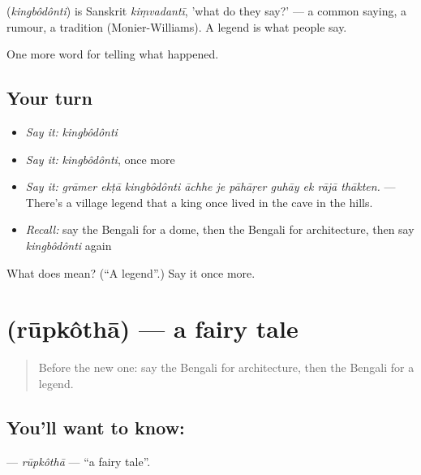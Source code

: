 \begin{cousinweb}
\textbf{} (\emph{kingbôdônti}) is Sanskrit \emph{kiṃvadantī}, 'what do they say?' — a common saying, a rumour, a tradition (Monier-Williams). A legend is what people say.
\end{cousinweb}

\begin{grammarlens}[title={What you've built}]
One more word for telling what happened.
\end{grammarlens}

\subsection*{Your turn}
\begin{itemize}
\raggedright
  \item \emph{Say it:} \emph{kingbôdônti}
  \item \emph{Say it:} \emph{kingbôdônti}, once more
  \item \emph{Say it:} \emph{grāmer ekṭā kingbôdônti āchhe je pāhāṛer guhāy ek rājā thākten.} — There's a village legend that a king once lived in the cave in the hills.
  \item \emph{Recall:} say the Bengali for a dome, then the Bengali for architecture, then say \emph{kingbôdônti} again
\end{itemize}

\begin{tcolorbox}[breakable,colback=teal!4,colframe=teal!35!black,title={Before you move on}]
What does  mean? (\textquotedblleft{}A legend\textquotedblright{}.) Say it once more.
\end{tcolorbox}
\section[\texorpdfstring{\bn{রূপকথা} (rūpkôthā)}{রূপকথা (rūpkôthā)}]{ (rūpkôthā) — a fairy tale}

\label{lesson:BN-C321-rupkotha}



\begin{quote}
Before the new one: say the Bengali for architecture, then the Bengali for a legend.
\end{quote}

\subsection*{You'll want to know: }
\textbf{} — \emph{rūpkôthā} — \textquotedblleft{}a fairy tale\textquotedblright{}.

